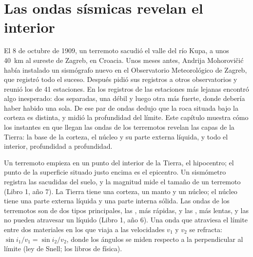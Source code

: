 \chapter{Las ondas sísmicas revelan el interior}\label{ch:g11:seismic-structure}

El 8 de octubre de 1909, un terremoto sacudió el valle del río Kupa, a unos
\qty{40}{km} al sureste de Zagreb, en Croacia. Unos meses antes, Andrija
Mohorovičić había instalado un sismógrafo nuevo en el Observatorio
Meteorológico de Zagreb, que registró todo el suceso. Después pidió sus
registros a otros observatorios y reunió los de 41 estaciones. En los
registros de las estaciones más lejanas encontró algo inesperado: dos 
separadas, una débil y luego otra más fuerte, donde debería haber habido una
sola. De ese par de ondas dedujo que la roca situada bajo la corteza es
distinta, y midió la profundidad del límite. Este capítulo muestra cómo los
instantes en que llegan las ondas de los terremotos revelan las capas de la
Tierra: la base de la corteza, el núcleo y su parte externa líquida, y todo
el interior, profundidad a profundidad.

\begin{recall}
Un terremoto empieza en un punto del interior de la Tierra, el hipocentro; el
punto de la superficie situado justo encima es el epicentro. Un sismómetro
registra las sacudidas del suelo, y la magnitud mide el tamaño de un
terremoto (Libro 1, año 7). La Tierra tiene una corteza, un manto y un
núcleo; el núcleo tiene una parte externa líquida y una parte interna sólida.
Las ondas de los terremotos son de dos tipos principales, las , más
rápidas, y las , más lentas, y las  no pueden atravesar un
líquido (Libro 1, año 6). Una onda que atraviesa el límite entre dos
materiales en los que viaja a las velocidades $v_1$ y $v_2$ se refracta:
$\sin i_1/v_1 = \sin i_2/v_2$, donde los ángulos se miden respecto a la
perpendicular al límite (ley de Snell; los libros de física).
\end{recall}

